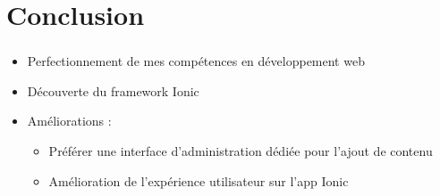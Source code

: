 \documentclass[10pt]{beamer}
\begin{document}
\section{Conclusion}
\begin{frame}
	\frametitle{\secname}
	\begin{itemize}
        \item Perfectionnement de mes compétences en développement web
        \item Découverte du framework Ionic
        \item Améliorations :
        \begin{itemize}
            \item Préférer une interface d'administration dédiée pour l'ajout de contenu
            \item Amélioration de l'expérience utilisateur sur l'app Ionic
        \end{itemize}
    \end{itemize}
\end{frame}
\end{document}
